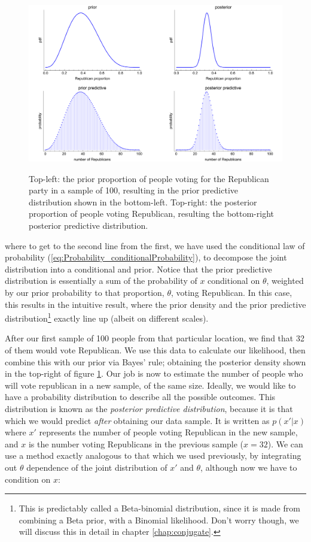\documentclass[11pt,fullpage]{book}
\begin{document}
\begin{figure}
\centering
\scalebox{0.4} 
{\includegraphics{Posterior_priorPosteriorPredictiveVoting.pdf}}
\caption{Top-left: the prior proportion of people voting for the Republican party in a sample of 100, resulting in the prior predictive distribution shown in the bottom-left. Top-right: the posterior proportion of people voting Republican, resulting the bottom-right posterior predictive distribution.}\label{fig:Posterior_priorPosteriorPredictiveVoting}
\end{figure}


where to get to the second line from the first, we have used the conditional law of probability (\ref{eq:Probability_conditionalProbability}), to decompose the joint distribution into a conditional and prior. Notice that the prior predictive distribution is essentially a sum of the probability of $x$ conditional on $\theta$, weighted by our prior probability to that proportion, $\theta$, voting Republican. In this case, this results in the intuitive result, where the prior density and the prior predictive distribution\footnote{This is predictably called a Beta-binomial distribution, since it is made from combining a Beta prior, with a Binomial likelihood. Don't worry though, we will discuss this in detail in chapter \ref{chap:conjugate}.} exactly line up (albeit on different scales).

After our first sample of 100 people from that particular location, we find that 32 of them would vote Republican. We use this data to calculate our likelihood, then combine this with our prior via Bayes' rule; obtaining the posterior density shown in the top-right of figure \ref{fig:Posterior_priorPosteriorPredictiveVoting}. Our job is now to estimate the number of people who will vote republican in a new sample, of the same size. Ideally, we would like to have a probability distribution to describe all the possible outcomes. This distribution is known as the \textit{posterior predictive distribution}, because it is that which we would predict \textit{after} obtaining our data sample. It is written as $p(x'|x)$ where $x'$ represents the number of people voting Republican in the new sample, and $x$ is the number voting Republicans in the previous sample ($x=32$). We can use a method exactly analogous to that which we used previously, by integrating out $\theta$ dependence of the joint distribution of $x'$ and $\theta$, although now we have to condition on $x$:
\end{document}
